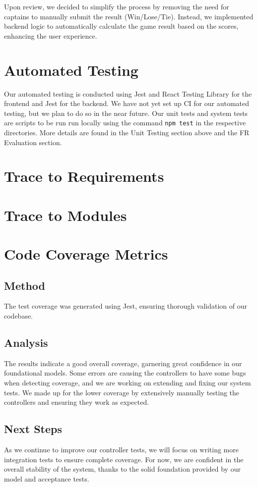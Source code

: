 \documentclass[12pt, titlepage]{article}
\begin{document}
Upon review, we decided to simplify the process by removing the need for captains to manually submit the result (Win/Lose/Tie). Instead, we implemented backend logic to automatically calculate the game result based on the scores, enhancing the user experience.

\section{Automated Testing}

Our automated testing is conducted using Jest and React Testing Library for the frontend and Jest for the backend. 
We have not yet set up CI for our automated testing, but we plan to do so in the near future.
Our unit tests and system tests are scripts to be run run locally using the command \texttt{npm test} in the respective directories.
More details are found in the Unit Testing section above and the FR Evaluation section.	
\section{Trace to Requirements}
		
\section{Trace to Modules}		

\section{Code Coverage Metrics}

\subsection{Method}

The test coverage was generated using Jest, ensuring thorough validation of our codebase.

\subsection{Analysis}
The results indicate a good overall coverage, garnering great confidence in our foundational models.
Some errors are causing the controllers to have some bugs when detecting coverage, and we are working on extending and fixing our system tests. We made up for the lower coverage by extensively manually testing the controllers and ensuring they work as expected.

\subsection{Next Steps}
As we continue to improve our controller tests, we will focus on writing more integration tests to ensure complete coverage. For now, we are confident in the overall stability of the system, thanks to the solid foundation provided by our model and acceptance tests.
\end{document}
